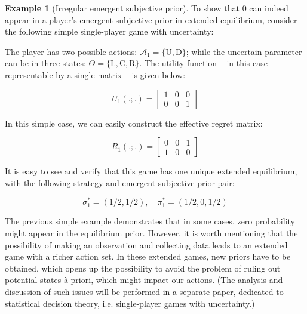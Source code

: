 \documentclass{article}
\theoremstyle{definition}
\newtheorem*{example}{Example}
\begin{document}
\begin{example}[Irregular emergent subjective prior]
    To show that $0$ can indeed appear in a player's emergent subjective prior in extended equilibrium, consider the following simple single-player game with uncertainty:

    The player has two possible actions: $\mathcal{A_1} = \{\mathrm{U},\mathrm{D}\}$; while the uncertain parameter can be in three states: $\Theta=\{\mathrm{L},\mathrm{C},\mathrm{R}\}$.
    The utility function -- in this case representable by a single matrix -- is given below:

    \begin{equation}
        U_1(.;.) = 
        \begin{bmatrix}
            1 & 0 & 0 \\
            0 & 0 & 1
        \end{bmatrix}
    \end{equation}

    In this simple case, we can easily construct the effective regret matrix:

    \begin{equation}
        R_1(.;.) = 
        \begin{bmatrix}
            0 & 0 & 1 \\
            1 & 0 & 0
        \end{bmatrix}
    \end{equation}

    It is easy to see and verify that this game has one unique extended equilibrium, with the following strategy and emergent subjective prior pair:

    \begin{equation}
        \sigma_1^* = (1/2,1/2), \quad \pi_1^* = (1/2, 0, 1/2)
    \end{equation}

    \end{example}

    The previous simple example demonstrates that in some cases, zero probability might appear in the equilibrium prior.
    However, it is worth mentioning that the possibility of making an observation and collecting data leads to an extended game with a richer action set. In these extended games, new priors have to be obtained, which opens up the possibility to avoid the problem of ruling out potential states à priori, which might impact our actions.
    (The analysis and discussion of such issues will be performed in a separate paper, dedicated to statistical decision theory, i.e. single-player games with uncertainty.)
    
\end{document}
